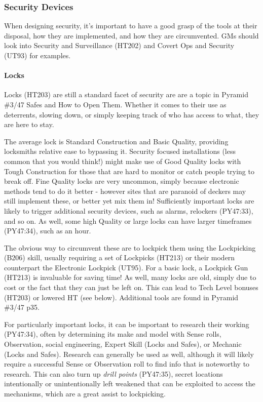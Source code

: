 \begin{multicols*}{2}
	\subsubsection{Security Devices}
	
	When designing security, it's important to have a good grasp of the tools at their disposal, how they are implemented, and how they are circumvented. GMs should look into Security and Surveillance (HT202) and Covert Ops and Security (UT93) for examples.
	
	\paragraph{Locks}
	
	Locks (HT203) are still a standard facet of security are are a topic in Pyramid \#3/47 Safes and How to Open Them. Whether it comes to their use as deterrents, slowing down, or simply keeping track of who has access to what, they are here to stay. 
	
	The average lock is Standard Construction and Basic Quality, providing locksmiths relative ease to bypassing it. Security focused installations (less common that you would think!) might make use of Good Quality locks with Tough Construction for those that are hard to monitor or catch people trying to break off. Fine Quality locks are very uncommon, simply because electronic methods tend to do it better - however sites that are paranoid of deckers may still implement these, or better yet mix them in! Sufficiently important locks are likely to trigger additional security devices, such as alarms, relockers (PY47:33), and so on. As well, some high Quality or large locks can have larger timeframes (PY47:34), such as an hour.
	
	The obvious way to circumvent these are to lockpick them using the Lockpicking (B206) skill, usually requiring a set of Lockpicks (HT213) or their modern counterpart the Electronic Lockpick (UT95). For a basic lock, a Lockpick Gun (HT213) is invaluable for saving time! As well, many locks are old, simply due to cost or the fact that they can just be left on. This can lead to Tech Level bonuses (HT203) or lowered HT (see below). Additional tools are found in Pyramid \#3/47 p35.
	
	For particularly important locks, it can be important to research their working (PY47:34), often by determining its make and model with Sense rolls, Observation, social engineering, Expert Skill (Locks and Safes), or Mechanic (Locks and Safes). Research can generally be used as well, although it will likely require a successful Sense or Observation roll to find info that is noteworthy to research. This can also turn up \textit{drill points} (PY47:35), secret locations intentionally or unintentionally left weakened that can be exploited to access the mechanisms, which are a great assist to lockpicking.
	

\end{multicols*}
